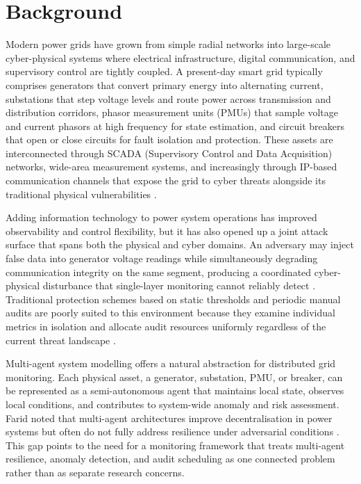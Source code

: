 
\section{Background}

Modern power grids have grown from simple radial networks into large-scale cyber-physical systems where electrical infrastructure, digital communication, and supervisory control are tightly coupled. A present-day smart grid typically comprises generators that convert primary energy into alternating current, substations that step voltage levels and route power across transmission and distribution corridors, phasor measurement units (PMUs) that sample voltage and current phasors at high frequency for state estimation, and circuit breakers that open or close circuits for fault isolation and protection. These assets are interconnected through SCADA (Supervisory Control and Data Acquisition) networks, wide-area measurement systems, and increasingly through IP-based communication channels that expose the grid to cyber threats alongside its traditional physical vulnerabilities \cite{achaal2024study, sharma2024survey}.

Adding information technology to power system operations has improved observability and control flexibility, but it has also opened up a joint attack surface that spans both the physical and cyber domains. An adversary may inject false data into generator voltage readings while simultaneously degrading communication integrity on the same segment, producing a coordinated cyber-physical disturbance that single-layer monitoring cannot reliably detect \cite{liu2009false, yan2020false}. Traditional protection schemes based on static thresholds and periodic manual audits are poorly suited to this environment because they examine individual metrics in isolation and allocate audit resources uniformly regardless of the current threat landscape \cite{priyadarsini2025enhancing}.

Multi-agent system modelling offers a natural abstraction for distributed grid monitoring. Each physical asset, a generator, substation, PMU, or breaker, can be represented as a semi-autonomous agent that maintains local state, observes local conditions, and contributes to system-wide anomaly and risk assessment. Farid noted that multi-agent architectures improve decentralisation in power systems but often do not fully address resilience under adversarial conditions \cite{farid2014multi}. This gap points to the need for a monitoring framework that treats multi-agent resilience, anomaly detection, and audit scheduling as one connected problem rather than as separate research concerns.

